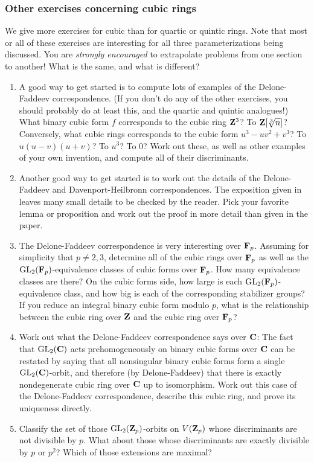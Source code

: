 \subsubsection{Other exercises concerning cubic rings}

We give more exercises for cubic than for quartic or quintic rings. Note that 
most or all of these exercises are interesting for all three parameterizations 
being discussed. You are \emph{strongly encouraged} to extrapolate problems 
from one section to another! What is the same, and what is different? 
\begin{enumerate}[\indent a)]
  \item A good way to get started is to compute lots of examples of the 
    Delone-Faddeev correspondence. (If you don't do any of the other 
    exercises, you should probably do at least this, and the quartic and 
    quintic analogues!) What binary cubic form $f$ corresponds to the cubic 
    ring $\mathbf{Z}^3$? To $\mathbf{Z}[\sqrt[3] n]$? Conversely, what cubic rings 
    corresponds to the cubic form $u^3-u v^2+v^3$? To $u(u-v)(u+v)$? To $u^3$? 
    To $0$? Work out these, as well as other examples of your own invention, 
    and compute all of their discriminants. 
  \item Another good way to get started is to work out the details of the 
    Delone-Faddeev and Davenport-Heilbronn correspondences. The exposition 
    given in \cite[\S 2]{bst13} leaves many small details to be checked by the 
    reader. Pick your favorite lemma or proposition and work out the proof in 
    more detail than given in the paper. 
  \item The Delone-Faddeev correspondence is very interesting over $\mathbf{F}_p$. 
    Assuming for simplicity that $p\ne 2,3$, determine all of the cubic rings 
    over $\mathbf{F}_p$ as well as the $\operatorname{GL}_2(\mathbf{F}_p)$-equivalence classes 
    of cubic forms over $\mathbf{F}_p$. How many equivalence classes are there? On the 
    cubic forms side, how large is each $\operatorname{GL}_2(\mathbf{F}_p)$-equivalence 
    class, and how big is each of the corresponding stabilizer groups? If you 
    reduce an integral binary cubic form modulo $p$, what is the relationship 
    between the cubic ring over $\mathbf{Z}$ and the cubic ring over $\mathbf{F}_p$?
  \item Work out what the Delone-Faddeev correspondence says over $\mathbf{C}$: The 
    fact that $\operatorname{GL}_2(\mathbf{C})$ acts prehomogeneously on binary cubic 
    forms over $\mathbf{C}$ can be restated by saying that all nonsingular binary 
    cubic forms form a single $\operatorname{GL}_2(\mathbf{C})$-orbit, and therefore (by 
    Delone-Faddeev) that there is exactly nondegenerate cubic ring over $\mathbf{C}$ 
    up to isomorphism. Work out this case of the Delone-Faddeev correspondence, 
    describe this cubic ring, and prove its uniqueness directly. 
  \item Classify the set of those $\operatorname{GL}_2(\mathbf{Z}_p)$-orbits on 
    $V(\mathbf{Z}_p)$ whose discriminants are not divisible by $p$. What about those 
    whose discriminants are exactly divisible by $p$ or $p^2$? Which of those 
    extensions are maximal? 
\end{enumerate}






